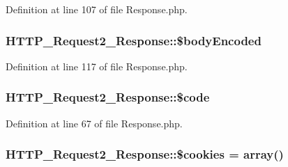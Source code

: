 Definition at line 107 of file Response.\+php.

\subsubsection[{\texorpdfstring{\$body\+Encoded}{$bodyEncoded}}]{\setlength{\rightskip}{0pt plus 5cm}H\+T\+T\+P\+\_\+\+Request2\+\_\+\+Response\+::\$body\+Encoded\hspace{0.3cm}{\ttfamily [protected]}}\hypertarget{classHTTP__Request2__Response_a1ab2bec927b0ac3d7cf82888479a4fea}{}\label{classHTTP__Request2__Response_a1ab2bec927b0ac3d7cf82888479a4fea}


Definition at line 117 of file Response.\+php.

\subsubsection[{\texorpdfstring{\$code}{$code}}]{\setlength{\rightskip}{0pt plus 5cm}H\+T\+T\+P\+\_\+\+Request2\+\_\+\+Response\+::\$code\hspace{0.3cm}{\ttfamily [protected]}}\hypertarget{classHTTP__Request2__Response_a974eeb592b307dca6c7d02e0311832f5}{}\label{classHTTP__Request2__Response_a974eeb592b307dca6c7d02e0311832f5}


Definition at line 67 of file Response.\+php.

\subsubsection[{\texorpdfstring{\$cookies}{$cookies}}]{\setlength{\rightskip}{0pt plus 5cm}H\+T\+T\+P\+\_\+\+Request2\+\_\+\+Response\+::\$cookies = array()\hspace{0.3cm}{\ttfamily [protected]}}\hypertarget{classHTTP__Request2__Response_af1d49532aaf677e27046fafff4f5e985}{}\label{classHTTP__Request2__Response_af1d49532aaf677e27046fafff4f5e985}


